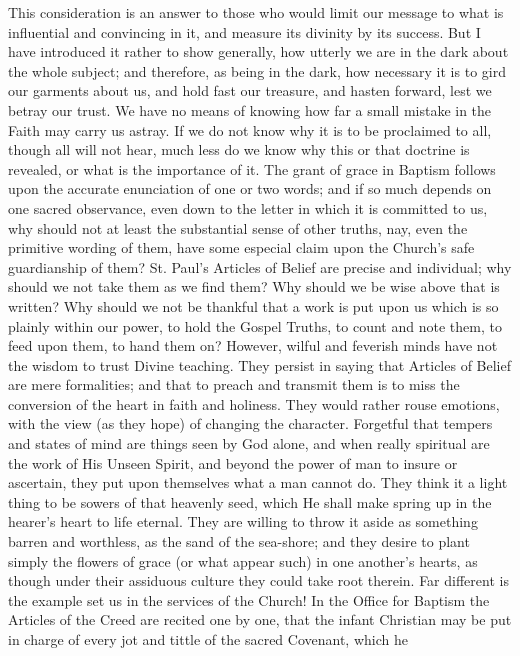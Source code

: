 This consideration is an answer to those who would limit our message
to what is influential and convincing in it, and measure its divinity by
its success. But I have introduced it rather to show generally, how
utterly we are in the dark about the whole subject; and therefore, as
being in the dark, how necessary it is to gird our garments about us,
and hold fast our treasure, and hasten forward, lest we betray our
trust. We have no means of knowing how far a small mistake in the Faith
may carry us astray. If we do not know why it is to be proclaimed to
all, though all will not hear, much less do we know why this or that
doctrine is revealed, or what is the importance of it. The grant of
grace in Baptism follows upon the accurate enunciation of one or two
words; and if so much depends on one sacred observance, even down to the
letter in which it is committed to us, why should not at least the
substantial sense of other truths, nay, even the primitive wording of
them, have some especial claim upon the Church's safe guardianship of
them? St. Paul's Articles of Belief are precise and individual; why
should we not take them as we find them? Why should we be wise above
that is written? Why should we not be thankful that a work is put upon
us which is so plainly within our power, to hold the Gospel Truths, to
count and note them, to feed upon them, to hand them on? However, wilful
and feverish minds have not the wisdom to trust Divine teaching. They
persist in saying that Articles of Belief are mere formalities; and that
to preach and transmit them is to miss the conversion of the heart in
faith and holiness. They would rather rouse emotions, with the view (as
they hope) of changing the character. Forgetful that tempers and states
of mind are things seen by God alone, and when really spiritual are the
work of His Unseen Spirit, and beyond the power of man to insure or
ascertain, they put upon themselves what a man cannot do. They think it
a light thing to be sowers of that heavenly seed, which He shall make
spring up in the hearer's heart to life eternal. They are willing to
throw it aside as something barren and worthless, as the sand of the
sea-shore; and they desire to plant simply the flowers of grace (or what
appear such) in one another's hearts, as though under their assiduous
culture they could take root therein. Far different is the example set
us in the services of the Church! In the Office for Baptism the Articles
of the Creed are recited one by one, that the infant Christian may be
put in charge of every jot and tittle of the sacred Covenant, which he
